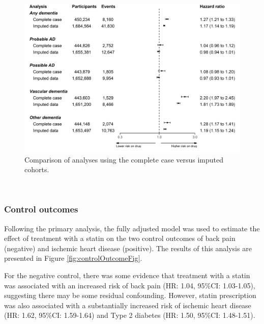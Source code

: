 \documentclass[a4paper, twoside]{templates/ociamthesis}
\begin{document}
~





\begin{figure}[H]
\includegraphics[width=1\linewidth]{figures/cprd-analysis/forester_complete_case} \caption[Complete case vs.~imputed data analysis]{Comparison of analyses using the complete case versus imputed cohorts.}\label{fig:completeCaseFig}
\end{figure}

~

\hypertarget{control-outcomes-1}{%
\subsubsection{Control outcomes}\label{control-outcomes-1}}

Following the primary analysis, the fully adjusted model was used to estimate the effect of treatment with a statin on the two control outcomes of back pain (negative) and ischemic heart disease (positive). The results of this analysis are presented in Figure \ref{fig:controlOutcomeFig}.

For the negative control, there was some evidence that treatment with a statin was associated with an increased risk of back pain (HR: 1.04, 95\%CI: 1.03-1.05), suggesting there may be some residual confounding. However, statin prescription was also associated with a substantially increased risk of ischemic heart disease (HR: 1.62, 95\%CI: 1.59-1.64) and Type 2 diabetes (HR: 1.50, 95\%CI: 1.48-1.51).

~
\end{document}

